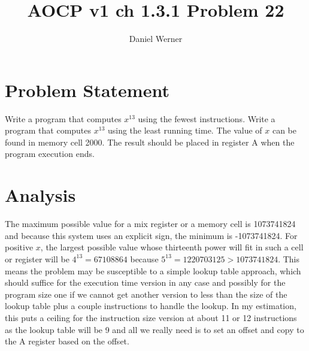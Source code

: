 \documentclass{article}
\title{AOCP v1 ch 1.3.1 Problem 22}
\author{Daniel Werner}
\begin{document}
\maketitle

\section*{
    Problem Statement
}

Write a program that computes $x^13$ using the fewest instructions.  Write a
program that computes $x^13$ using the least running time.  The value of $x$
can be found in memory cell 2000.  The result should be placed in register A
when the program execution ends.

\section*{
    Analysis
}

The maximum possible value for a mix register or a memory cell
is 1073741824 and because this system uses an explicit sign,
the minimum is -1073741824.  For positive $x$, the largest
possible value whose thirteenth power will fit in such a cell
or register will be $4^{13}=67108864$ because $5^{13}=1220703125 >
1073741824$.  This means the problem may be susceptible to a
simple lookup table approach, which should suffice for the
execution time version in any case and possibly for the
program size one if we cannot get another version to less
than the size of the lookup table plus a couple instructions
to handle the lookup.  In my estimation, this puts a ceiling
for the instruction size version at about 11 or 12 instructions
as the lookup table will be 9 and all we really need is to
set an offset and copy to the A register based on the offset.
\end{document}
